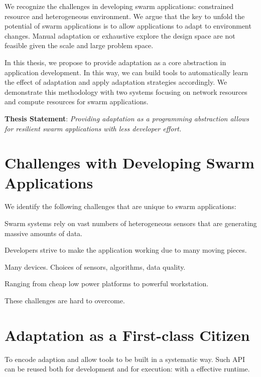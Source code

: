 \documentclass[thesis.tex]{subfiles}
\begin{document}
We recognize the challenges in developing swarm applications: constrained
resource and heterogeneous environment. We argue that the key to unfold the
potential of swarm applications is to allow applications to adapt to environment
changes. Manual adaptation or exhaustive explore the design space are not
feasible given the scale and large problem space.

In this thesis, we propose to provide adaptation as a core abstraction in
application development. In this way, we can build tools to automatically learn
the effect of adaptation and apply adaptation strategies accordingly. We
demonstrate this methodology with two systems focusing on network resources and
compute resources for swarm applications.

\vspace{1em}

\noindent\textbf{Thesis Statement}: \textit{Providing adaptation as a programming
  abstraction allows for resilient swarm applications with less developer
  effort.}

\vspace{1em}

\section{Challenges with Developing Swarm Applications}
\label{sec:chall-with-exist}

We identify the following challenges that are unique to swarm applications:

 Swarm systems rely on vast numbers of heterogeneous
sensors that are generating massive amounts of data.

 Developers strive to make the application working due
to many moving pieces.

 Many devices. Choices of sensors, algorithms, data
quality.

 Ranging from cheap low power platforms to
powerful workstation.

These challenges are hard to overcome.

\section{Adaptation as a First-class Citizen}
\label{sec:adaptation}

 To encode adaption and allow tools to be built in a systematic way.
Such API can be reused both for development and for execution: with a effective
runtime.
\end{document}
